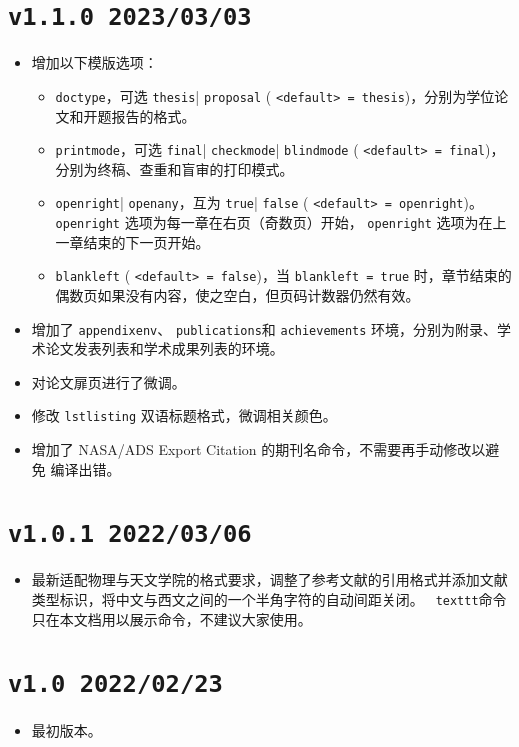 \section*{\texttt{v1.1.0 2023/03/03}}
\begin{itemize}
    \item 增加以下模版选项：
    \begin{itemize}
        \item \texttt{doctype}，可选 \texttt{thesis}| \texttt{proposal} ( \texttt{<default> = thesis})，分别为学位论文和开题报告的格式。
        \item \texttt{printmode}，可选 \texttt{final}| \texttt{checkmode}| \texttt{blindmode} ( \texttt{<default> = final})，分别为终稿、查重和盲审的打印模式。
        \item \texttt{openright}| \texttt{openany}，互为 \texttt{true}| \texttt{false} ( \texttt{<default> = openright})。\\ \texttt{openright} 选项为每一章在右页（奇数页）开始， \texttt{openright} 选项为在上一章结束的下一页开始。
        \item \texttt{blankleft} ( \texttt{<default> = false})，当 \texttt{blankleft = true} 时，章节结束的偶数页如果没有内容，使之空白，但页码计数器仍然有效。
    \end{itemize}
    \item 增加了 \texttt{appendixenv}、 \texttt{publications}和 \texttt{achievements} 环境，分别为附录、学术论文发表列表和学术成果列表的环境。
    \item 对论文扉页进行了微调。
    \item 修改 \texttt{lstlisting} 双语标题格式，微调相关颜色。
    \item 增加了 NASA/ADS Export Citation 的期刊名命令，不需要再手动修改以避免  编译出错。
\end{itemize}

\section*{\texttt{v1.0.1 2022/03/06}}
\begin{itemize}
    \item 最新适配物理与天文学院的格式要求，调整了参考文献的引用格式并添加文献类型标识，将中文与西文之间的一个半角字符的自动间距关闭。 \texttt{ texttt}命令只在本文档用以展示命令，不建议大家使用。
\end{itemize}

\section*{\texttt{v1.0 2022/02/23}}
\begin{itemize}
    \item 最初版本。
\end{itemize}
